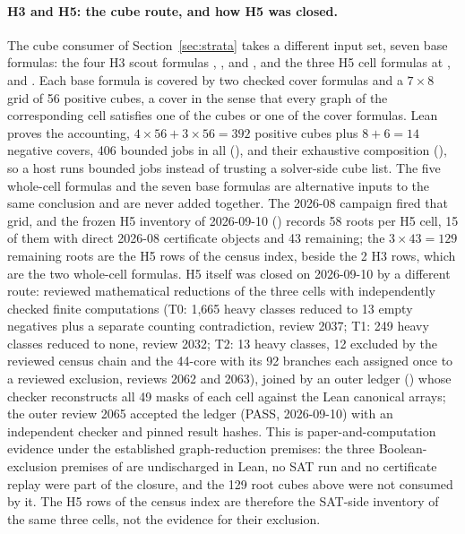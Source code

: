 \documentclass{anvil-paper}
\newcommand{\repobase}{https://github.com/rjwalters/lean-genius/blob/erdos85/integration}
\newcommand{\repofile}[2]{\href{\repobase/#1}{\lean{#2}}}
\theoremstyle{definition}
\begin{document}
\paragraph{H3 and H5: the cube route, and how H5 was closed.} The cube consumer of Section~\ref{sec:strata} takes a different input set, seven base formulas: the four H3 scout formulas , ,  and , and the three H5 cell formulas  at ,  and . Each base formula is covered by two checked cover formulas and a $7\times 8$ grid of 56 positive cubes, a cover in the sense that every graph of the corresponding cell satisfies one of the cubes or one of the cover formulas. Lean proves the accounting, $4\times 56+3\times 56=392$ positive cubes plus $8+6=14$ negative covers, 406 bounded jobs in all (), and their exhaustive composition (), so a host runs bounded jobs instead of trusting a solver-side cube list. The five whole-cell formulas and the seven base formulas are alternative inputs to the same conclusion and are never added together. The 2026-08 campaign fired that grid, and the frozen H5 inventory of 2026-09-10 (\repofile{research/problems/erdos-85-wip-01/PHASE_B_H5_H7_INVENTORY_20260910.md}{PHASE_B_H5_H7_INVENTORY_20260910.md}) records 58 roots per H5 cell, 15 of them with direct 2026-08 certificate objects and 43 remaining; the $3\times 43=129$ remaining roots are the H5 rows of the census index, beside the 2 H3 rows, which are the two whole-cell formulas. H5 itself was closed on 2026-09-10 by a different route: reviewed mathematical reductions of the three cells with independently checked finite computations (T0: 1,665 heavy classes reduced to 13 empty negatives plus a separate counting contradiction, review 2037; T1: 249 heavy classes reduced to none, review 2032; T2: 13 heavy classes, 12 excluded by the reviewed census chain and the 44-core with its 92 branches each assigned once to a reviewed exclusion, reviews 2062 and 2063), joined by an outer ledger (\repofile{research/problems/erdos-85-wip-01/q7_h5_closure_ledger/}{q7_h5_closure_ledger/}) whose checker reconstructs all 49 masks of each cell against the Lean canonical arrays; the outer review 2065 accepted the ledger (PASS, 2026-09-10) with an independent checker and pinned result hashes. This is paper-and-computation evidence under the established graph-reduction premises: the three Boolean-exclusion premises of  are undischarged in Lean, no SAT run and no certificate replay were part of the closure, and the 129 root cubes above were not consumed by it. The H5 rows of the census index are therefore the SAT-side inventory of the same three cells, not the evidence for their exclusion.
\end{document}

